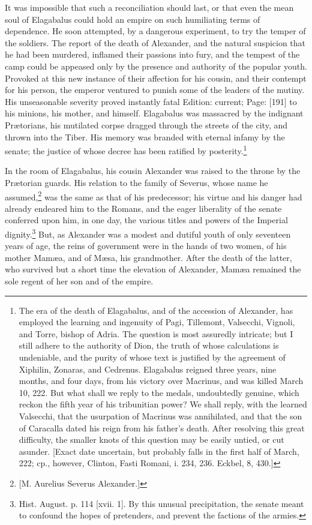 It was impossible that such a reconciliation should last, or that even the mean soul of Elagabalus could hold an empire on such humiliating terms of dependence. He soon attempted, by a dangerous experiment, to try the temper of the soldiers. The report of the death of Alexander, and the natural suspicion that he had been murdered, inflamed their passions into fury, and the tempest of the camp could be appeased only by the presence and authority of the popular youth. Provoked at this new instance of their affection for his cousin, and their contempt for his person, the emperor ventured to punish some of the leaders of the mutiny. His unseasonable severity proved instantly fatal Edition: current; Page: [191] to his minions, his mother, and himself. Elagabalus was massacred by the indignant Prætorians, his mutilated corpse dragged through the streets of the city, and thrown into the Tiber. His memory was branded with eternal infamy by the senate; the justice of whose decree has been ratified by posterity.\footnote{The era of the death of Elagabalus, and of the accession of Alexander, has employed the learning and ingenuity of Pagi, Tillemont, Valsecchi, Vignoli, and Torre, bishop of Adria. The question is most assuredly intricate; but I still adhere to the authority of Dion, the truth of whose calculations is undeniable, and the purity of whose text is justified by the agreement of Xiphilin, Zonaras, and Cedrenus. Elagabalus reigned three years, nine months, and four days, from his victory over Macrinus, and was killed March 10, 222. But what shall we reply to the medals, undoubtedly genuine, which reckon the fifth year of his tribunitian power? We shall reply, with the learned Valsecchi, that the usurpation of Macrinus was annihilated, and that the son of Caracalla dated his reign from his father\texthebrew{}’s death. After resolving this great difficulty, the smaller knots of this question may be easily untied, or cut asunder. [Exact date uncertain, but probably falls in the first half of March, 222; cp., however, Clinton, Fasti Romani, i. 234, 236. Eckbel, 8, 430.]}

In the room of Elagabalus, his cousin Alexander was raised to the throne by the Prætorian guards. His relation to the family of Severus, whose name he assumed,\footnote{[M. Aurelius Severus Alexander.]} was the same as that of his predecessor; his virtue and his danger had already endeared him to the Romans, and the eager liberality of the senate conferred upon him, in one day, the various titles and powers of the Imperial dignity.\footnote{Hist. August. p. 114 [xvii. 1]. By this unusual precipitation, the senate meant to confound the hopes of pretenders, and prevent the factions of the armies.} But, as Alexander was a modest and dutiful youth of only seventeen years of age, the reins of government were in the hands of two women, of his mother Mamæa, and of Mæsa, his grandmother. After the death of the latter, who survived but a short time the elevation of Alexander, Mamæa remained the sole regent of her son and of the empire.


